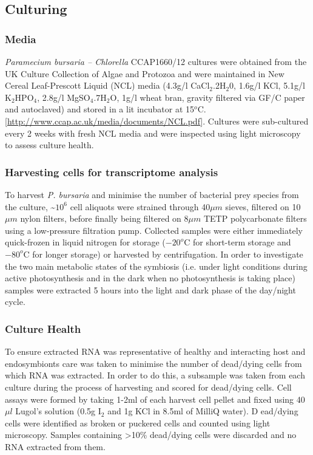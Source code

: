 \subsection{Culturing}

\subsubsection{Media}
\textit{Paramecium bursaria – Chlorella} CCAP1660/12 cultures were obtained from the UK Culture Collection of Algae and Protozoa and were maintained in New Cereal Leaf-Prescott Liquid (NCL) media (4.3g/l CaCl$_{2}$.2H$_{2}$0, 1.6g/l KCl, 5.1g/l K$_{2}$HPO$_{4}$, 2.8g/l MgSO$_{4}$.7H$_{2}$O, 1g/l wheat bran, gravity filtered via GF/C paper and autoclaved) and stored in a lit incubator at 15$^{o}$C. [\url{http://www.ccap.ac.uk/media/documents/NCL.pdf}].  
Cultures were sub-cultured every 2 weeks with fresh NCL media and were inspected using light microscopy to assess culture health.  

\subsubsection{Harvesting cells for transcriptome analysis}
To harvest \textit{P. bursaria} and minimise the number of bacterial prey species from the culture, \textasciitilde $10^{6}$ cell aliquots were strained through 40$\mu m$ sieves, filtered on 10$\mu m$ nylon filters, before finally being filtered on 8$\mu m$ TETP polycarbonate filters using a low-pressure filtration pump.  
Collected samples were either immediately quick-frozen in liquid nitrogen for storage ($-20^{o}$C for short-term storage and $-80^{o}$C for longer storage) or harvested by centrifugation.  
In order to investigate the two main metabolic states of the symbiosis (i.e. under light conditions during active photosynthesis and in the dark when no photosynthesis is taking place) samples were extracted 5 hours into the light and dark phase of the day/night cycle.

\subsubsection{Culture Health}
To ensure extracted RNA was representative of healthy and interacting host and endosymbionts care was taken to minimise the number of dead/dying cells from which RNA was extracted.  
In order to do this, a subsample was taken from each culture during the process of harvesting and scored for dead/dying cells.  
Cell assays were formed by taking 1-2ml of each harvest cell pellet and fixed using 40$\mu l$ Lugol's solution (0.5g I$_{2}$ and 1g KCl in 8.5ml of MilliQ water). D
ead/dying cells were identified as broken or puckered cells and counted using light microscopy.  
Samples containing >10\% dead/dying cells were discarded and no RNA extracted from them.

